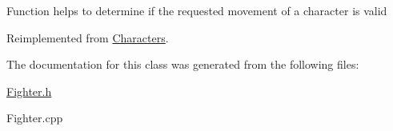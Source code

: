 Function helps to determine if the requested movement of a character is valid 

Reimplemented from \hyperlink{class_characters_a42bbd977aed8772f446510e7fcfd577f}{Characters}.



The documentation for this class was generated from the following files\+:\begin{DoxyCompactItemize}
\item 
\hyperlink{_fighter_8h}{Fighter.\+h}\item 
Fighter.\+cpp\end{DoxyCompactItemize}
